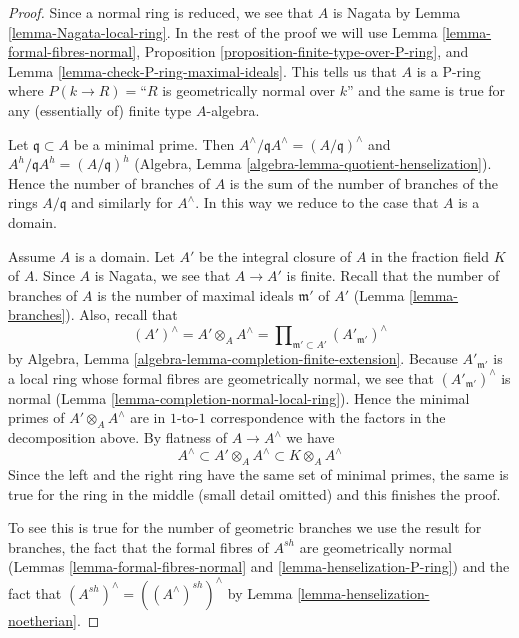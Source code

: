 \documentclass[10pt,a4paper]{amsart}
\theoremstyle{plain}
\theoremstyle{definition}
\theoremstyle{remark}
\numberwithin{equation}{subsection}
\begin{document}
\begin{proof}
Since a normal ring is reduced, we see that $A$ is Nagata by
Lemma \ref{lemma-Nagata-local-ring}. In the rest of the proof
we will use Lemma \ref{lemma-formal-fibres-normal},
Proposition \ref{proposition-finite-type-over-P-ring}, and
Lemma \ref{lemma-check-P-ring-maximal-ideals}. This tells us
that $A$ is a P-ring where $P(k \to R) = $``$R$ is geometrically
normal over $k$'' and the same is true for any (essentially of) finite type
$A$-algebra.

\medskip\noindent
Let $\mathfrak q \subset A$ be a minimal prime. Then
$A^\wedge/\mathfrak q A^\wedge = (A/\mathfrak q)^\wedge$
and $A^h/\mathfrak qA^h = (A/\mathfrak q)^h$
(Algebra, Lemma \ref{algebra-lemma-quotient-henselization}).
Hence the number of branches of $A$ is the sum of the
number of branches of the rings $A/\mathfrak q$ and
similarly for $A^\wedge$. In this way we reduce
to the case that $A$ is a domain.

\medskip\noindent
Assume $A$ is a domain. Let $A'$ be the integral closure of $A$
in the fraction field $K$ of $A$. Since $A$ is Nagata, we see that
$A \to A'$ is finite. Recall that the number of branches of
$A$ is the number of maximal ideals $\mathfrak m'$ of $A'$
(Lemma \ref{lemma-branches}). Also, recall that
$$
(A')^\wedge = A' \otimes_A A^\wedge =
\prod\nolimits_{\mathfrak m' \subset A'} (A'_{\mathfrak m'})^\wedge
$$
by Algebra, Lemma \ref{algebra-lemma-completion-finite-extension}.
Because $A'_{\mathfrak m'}$ is a local ring whose formal
fibres are geometrically normal, we see that
$(A'_{\mathfrak m'})^\wedge$ is normal
(Lemma \ref{lemma-completion-normal-local-ring}).
Hence the minimal primes of $A' \otimes_A A^\wedge$
are in $1$-to-$1$ correspondence with the factors in the
decomposition above. By flatness of $A \to A^\wedge$ we have
$$
A^\wedge \subset A' \otimes_A A^\wedge \subset K \otimes_A A^\wedge
$$
Since the left and the right ring have the same set of minimal
primes, the same is true for the ring in the middle (small
detail omitted) and this finishes the proof.

\medskip\noindent
To see this is true for the number of geometric branches
we use the result for branches, the fact that the formal
fibres of $A^{sh}$ are geometrically normal
(Lemmas \ref{lemma-formal-fibres-normal} and
\ref{lemma-henselization-P-ring})
and the fact that $(A^{sh})^\wedge = ((A^\wedge)^{sh})^\wedge$
by Lemma \ref{lemma-henselization-noetherian}.
\end{proof}
\end{document}
